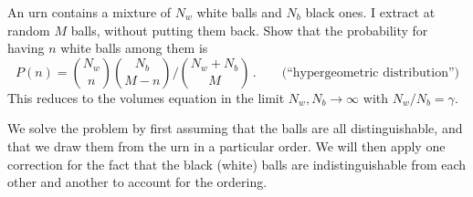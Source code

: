 

An urn contains a mixture of $N_w$ white balls and $N_b$ black ones.
I extract at random $M$ balls, without putting them back.
Show that the probability for having $n$ white balls among them is
\begin{equation*}
P(n) = \binom{N_w}{n} \binom{N_b}{M-n} / \binom{N_w + N_b}{M} \, . \qquad \text{(``hypergeometric distribution'')}
\end{equation*}
This reduces to the volumes equation in the limit $N_w, N_b \rightarrow \infty$ with $N_w/N_b = \gamma$.


We solve the problem by first assuming that the balls are all distinguishable, and that we draw them from the urn in a particular order.
We will then apply one correction for the fact that the black (white) balls are indistinguishable from each other and another to account for the ordering.

